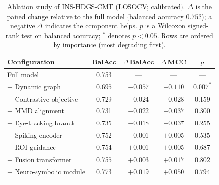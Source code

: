 \begin{table}[t]
  \caption{Ablation study of INS-HDGS-CMT (LOSOCV; calibrated). $\Delta$ is the paired change relative to the full model (balanced accuracy $0.753$); a negative $\Delta$ indicates the component helps. $p$ is a Wilcoxon signed-rank test on balanced accuracy; $^{*}$ denotes $p<0.05$. Rows are ordered by importance (most degrading first).}
  \label{tab:ablation}
  \centering
  \begin{tabular}{@{}lcccc@{}}
    \toprule
    Configuration & BalAcc & $\Delta$\,BalAcc & $\Delta$\,MCC & $p$ \\
    \midrule
    Full model                & 0.753 & ---      & ---      & --- \\
    $-$ Dynamic graph         & 0.696 & $-0.057$ & $-0.110$ & $0.007^{*}$ \\
    $-$ Contrastive objective & 0.729 & $-0.024$ & $-0.028$ & $0.159$ \\
    $-$ MMD alignment         & 0.731 & $-0.022$ & $-0.037$ & $0.300$ \\
    $-$ Eye-tracking branch   & 0.735 & $-0.018$ & $-0.037$ & $0.255$ \\
    $-$ Spiking encoder       & 0.752 & $-0.001$ & $+0.005$ & $0.535$ \\
    $-$ ROI guidance          & 0.754 & $+0.001$ & $+0.005$ & $0.687$ \\
    $-$ Fusion transformer    & 0.756 & $+0.003$ & $+0.017$ & $0.802$ \\
    $-$ Neuro-symbolic module & 0.773 & $+0.019$ & $+0.050$ & $0.794$ \\
    \botrule
  \end{tabular}
\end{table}
